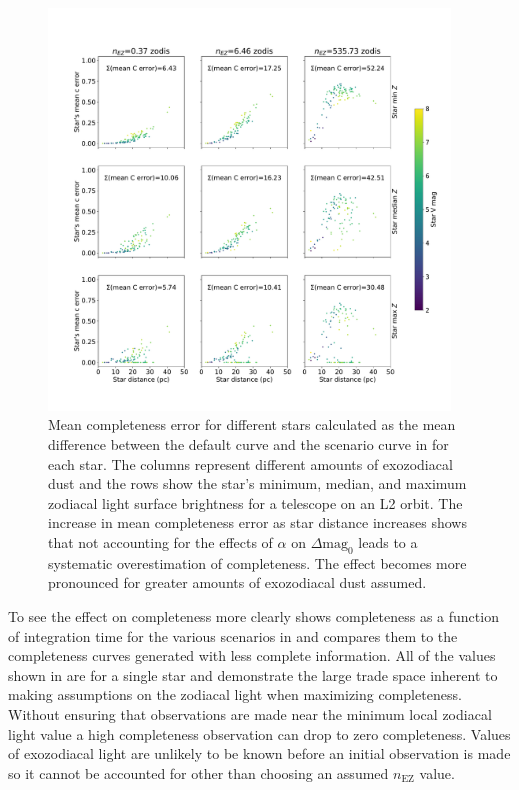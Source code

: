 \begin{figure}
  \begin{center}
    \includegraphics[width=0.95\textwidth]{ch3/figures/mean_comp_errors.pdf}
  \end{center}
  \caption{Mean completeness error for different stars calculated as the mean difference between
  the default curve and the scenario curve in  for each star. The columns represent
  different amounts of exozodiacal dust and the rows show the star's minimum, median, and maximum zodiacal
  light surface brightness for a telescope on an L2 orbit. The increase in 
  mean completeness error as star distance increases shows that not accounting for the effects of
  $\alpha$ on $\Delta\textrm{mag}_0$ leads to a systematic overestimation of completeness. 
  The effect becomes more pronounced for greater amounts of exozodiacal dust 
  assumed.}
  \label{fig:mean_comp_errors}
\end{figure}

To see the effect on completeness more clearly  shows
completeness as a function of integration time for the various scenarios in
 and compares them to the completeness curves generated
with less complete information. All of the values shown in
 are for a
single star and demonstrate the large trade space inherent to making
assumptions on the zodiacal light when maximizing completeness. Without
ensuring that observations are made near the minimum local zodiacal light value
a high completeness observation can drop to zero completeness. Values of
exozodiacal light are unlikely to be known before an initial observation is
made so it cannot be accounted for other than choosing an assumed $n_\textrm{EZ}$
value.

